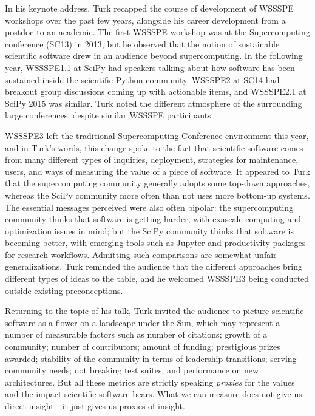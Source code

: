 \documentclass[11pt, oneside]{amsart}
\begin{document}
In his keynote address, Turk recapped the course of development of WSSSPE
workshops over the past few years, alongside his career development from a
postdoc to an academic. The first WSSSPE workshop was at the Supercomputing
conference (SC13) in 2013, but he observed that the notion of sustainable
scientific software drew in an audience beyond supercomputing. In the following
year, WSSSPE1.1 at SciPy had speakers talking about how software has been
sustained inside the scientific Python community. WSSSPE2 at SC14 had breakout
group discussions coming up with actionable items, and WSSSPE2.1 at SciPy 2015
was similar. Turk noted the different atmosphere of the surrounding large
conferences, despite similar WSSSPE participants.

WSSSPE3 left the traditional Supercomputing Conference environment this year,
and in Turk's words, this change spoke to the fact that scientific software
comes from many different types of inquiries, deployment, strategies for
maintenance, users, and ways of measuring the value of a piece of software. It
appeared to Turk that the supercomputing community generally adopts some
top-down approaches, whereas the SciPy community more often than not uses more
bottom-up systems. The essential messages perceived were also often bipolar: the
supercomputing community thinks that software is getting harder, with exascale
computing and optimization issues in mind; but the SciPy community thinks that
software is becoming better, with emerging tools such as Jupyter and
productivity packages for research workflows. Admitting such comparisons are
somewhat unfair generalizations, Turk reminded the audience that the different
approaches bring different types of ideas to the table, and he welcomed WSSSPE3
being conducted outside existing preconceptions.

Returning to the topic of his talk, Turk invited the audience to picture
scientific software as a flower on a landscape under the Sun, which may
represent a number of measurable factors such as number of citations; growth of
a community; number of contributors; amount of funding; prestigious prizes
awarded; stability of the community in terms of leadership transitions; serving
community needs; not breaking test suites; and performance on new architectures.
But all these metrics are strictly speaking \emph{proxies} for the values and
the impact scientific software bears. What we can measure does not give us
direct insight---it just gives us proxies of insight.
  
\end{document}
